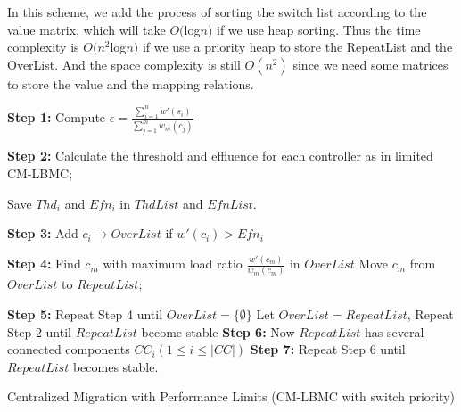 In this scheme, we add the process of sorting the switch list according to the value matrix, which will take $O($log$n)$ if we use heap sorting. Thus the time complexity is $O(n^2$log$n)$ if we use a priority heap to store the RepeatList and the OverList. And the space complexity is still $O(n^2)$ since we need some matrices to store the value and the mapping relations.

\vspace{-4mm}
\begin{algorithm}
{}
\BlankLine

\textbf{Step 1:}
Compute $\epsilon = \frac{\sum_{i=1}^{n} w'(s_i)}{\sum_{j=1}^{m} w_m(c_j)}$

\textbf{Step 2:}
Calculate the threshold and effluence for each controller as in limited CM-LBMC;

Save $Thd_i$ and $Efn_i$ in $ThdList$ and $EfnList$.

\textbf{Step 3:}
Add $c_i\rightarrow OverList$ if $w'(c_i)>Efn_i$\;

\textbf{Step 4:}
Find $c_m$ with maximum load ratio $\frac{w'(c_m)}{w_m(c_m)}$ in $OverList$\;
{
Move $c_m$ from $OverList$ to $RepeatList$;
}

\textbf{Step 5:}
Repeat Step 4 until $OverList=\{\emptyset\}$\;
Let $OverList=RepeatList$, Repeat Step 2 until $RepeatList$ become stable\;
\textbf{Step 6:}
Now $RepeatList$ has several connected components $CC_i(1\le i\le |CC|)$\;
\textbf{Step 7:}
Repeat Step 6 until $RepeatList$ becomes stable.

\caption{Centralized Migration with Performance Limits (CM-LBMC with switch priority)}\label{Alg-valueCM}
\end{algorithm}
